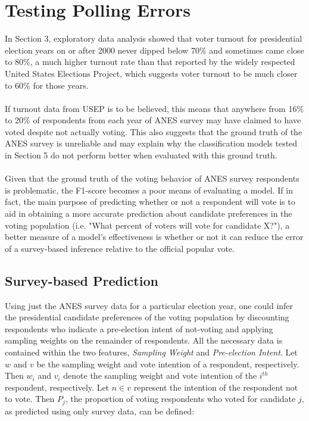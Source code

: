 \documentclass{article}
\begin{document}
	\section{Testing Polling Errors}
	
	In Section 3, exploratory data analysis showed that voter turnout for presidential election years on or after 2000 never dipped below 70\% and sometimes came close to 80\%, a much higher turnout rate than that reported by the widely respected United States Elections Project, which suggests voter turnout to be much closer to 60\% for those years.
	\\\\
	If turnout data from USEP is to be believed, this means that anywhere from 16\% to 20\% of respondents from each year of ANES survey may have claimed to have voted despite not actually voting. This also suggests that the ground truth of the ANES survey is unreliable and may explain why the classification models tested in Section 5 do not perform better when evaluated with this ground truth.
	\\\\
	Given that the ground truth of the voting behavior of ANES survey respondents is problematic, the F1-score becomes a poor means of evaluating a model. If in fact, the main purpose of predicting whether or not a respondent will vote is to aid in obtaining a more accurate prediction about candidate preferences in the voting population (i.e. "What percent of voters will vote for candidate X?"), a better measure of a model's effectiveness is whether or not it can reduce the error of a survey-based inference relative to the official popular vote.
	
	\subsection{Survey-based Prediction}
	
	Using just the ANES survey data for a particular election year, one could infer the presidential candidate preferences of the voting population by discounting respondents who indicate a pre-election intent of not-voting and applying sampling weights on the remainder of respondents. All the necessary data is contained within the two features, \textit{Sampling Weight} and \textit{Pre-election Intent}. Let $w$ and $v$ be the sampling weight and vote intention of a respondent, respectively. Then $w_i$ and $v_i$ denote the sampling weight and vote intention of the $i^{th}$ respondent, respectively. Let $n \in v$ represent the intention of the respondent not to vote. Then $P_j$, the proportion of voting respondents who voted for candidate $j$, as predicted using only survey data, can be defined:
\end{document}
